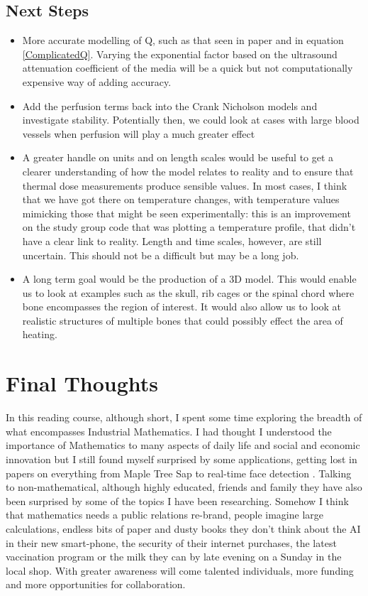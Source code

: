 \documentclass[11pt]{article} %
\begin{document}
\subsection{Next Steps}
\begin{itemize}
	\item More accurate modelling of Q, such as that seen in paper \cite{Scott2014} and in equation \ref{ComplicatedQ}. Varying the exponential factor based on the ultrasound attenuation coefficient of the media will be a quick but not computationally expensive way of adding accuracy. 
	\item Add the perfusion terms back into the Crank Nicholson models and investigate stability. Potentially then, we could look at cases with large blood vessels when perfusion will play a much greater effect
	\item A greater handle on units and on length scales would be useful to get a clearer understanding of how the model relates to reality and to ensure that thermal dose measurements produce sensible values. In most cases, I think that we have got there on temperature changes, with temperature values mimicking those that might be seen experimentally: this is an improvement on the study group code that was plotting a temperature profile, that didn't have a clear link to reality.  Length and time scales, however,  are still uncertain. This should not be a difficult but may be a long job.
	\item A long term goal would be the production of a  3D model. This would enable us  to look at examples such as the skull, rib cages or the spinal chord where bone encompasses the region of interest. It would also allow us to look at realistic structures of multiple bones that could possibly effect the area of heating.
\end{itemize}

  \pagebreak
	\section{Final Thoughts} 
In this reading course, although short, I spent some time exploring the breadth of what encompasses Industrial Mathematics.  I had thought I understood the importance of Mathematics to many aspects of daily life and social and economic innovation but I still found myself surprised by some applications, getting lost in papers on everything from  Maple Tree Sap \cite{Stockie2015} to real-time face detection \cite{Viola2004}. Talking to non-mathematical, although highly educated, friends and family they have also been surprised by some of the topics I have been researching. Somehow I think that mathematics needs a public relations re-brand, people imagine large calculations, endless bits of paper and dusty books they don't think about the AI in their new smart-phone, the security of their internet purchases, the latest vaccination program or the milk they can by late evening on a Sunday in the local shop. With greater awareness will come talented individuals, more funding and more opportunities for collaboration. 
\end{document}
